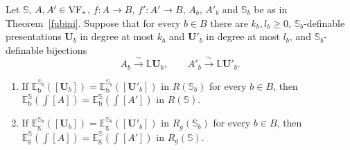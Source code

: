 \begin{thm}\label{thm:mixed}
Let $\mathbb S$, $A,A'\in\mathrm{VF}_*$, $f:A\to B$, $f':A'\to B$, $A_b$, $A'_b$ and
$\mathbb S_b$ be as in Theorem~\ref{fubini}. Suppose that for every
$b\in B$ there are $k_b,l_b\geq0$, $\mathbb S_b$-definable presentations
$\bm U_b$ in degree at most $k_b$ and $\bm U'_b$ in degree at most $l_b$, and
$\mathbb S_b$-definable bijections
\[
 A_b\xrightarrow{\ \sim\ }\mathbb L\bm U_b,
 \qquad
 A'_b\xrightarrow{\ \sim\ }\mathbb L\bm U'_b .
\]
\begin{enumerate}
\item If
$\mathbb E_{\mathrm b}^{\mathbb S_b}([\bm U_b])
 =\mathbb E_{\mathrm b}^{\mathbb S_b}([\bm U'_b])$
in $R(\mathbb S_b)$ for every $b\in B$, then
$\mathbb E_{\mathrm b}^{\mathbb S}(\int[A])
 =\mathbb E_{\mathrm b}^{\mathbb S}(\int[A'])$ in $R(\mathbb S)$.
\item If
$\mathbb E_{\mathrm g}^{\mathbb S_b}([\bm U_b])
 =\mathbb E_{\mathrm g}^{\mathbb S_b}([\bm U'_b])$
in $R_g(\mathbb S_b)$ for every $b\in B$, then
$\mathbb E_{\mathrm g}^{\mathbb S}(\int[A])
 =\mathbb E_{\mathrm g}^{\mathbb S}(\int[A'])$ in $R_g(\mathbb S)$.
\end{enumerate}
\end{thm}

